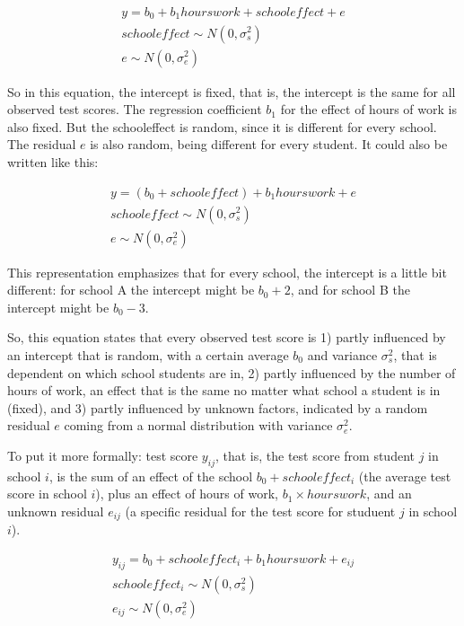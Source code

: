 \documentclass[]{book}\usepackage[]{graphicx}\usepackage[]{color}
\begin{document}
\begin{eqnarray}
y = b_0 + b_1 hourswork + schooleffect + e \\
schooleffect \sim N(0, \sigma_s^2)\\
e \sim N(0, \sigma_e^2)
\end{eqnarray}

So in this equation, the intercept is fixed, that is, the intercept is the same for all observed test scores. The regression coefficient $b_1$ for the effect of hours of work is also fixed. But the schooleffect is random, since it is different for every school. The residual $e$ is also random, being different for every student. It could also be written like this:

\begin{eqnarray}
y = (b_0  + schooleffect) + b_1 hourswork + e \\
schooleffect \sim N(0, \sigma_s^2)\\
e \sim N(0, \sigma_e^2)
\end{eqnarray}


This representation emphasizes that for every school, the intercept is a little bit different: for school A the intercept might be $b_0 + 2$, and for school B the intercept might be $b_0 - 3$.

So, this equation states that every observed test score is 1) partly influenced by an intercept that is random, with a certain average $b_0$ and variance $\sigma_s^2$, that is dependent on which school students are in, 2) partly influenced by the number of hours of work, an effect that is the same no matter what school a student is in (fixed), and 3) partly influenced by unknown factors, indicated by a random residual $e$ coming from a normal distribution with variance $\sigma^2_e$.

To put it more formally: test score $y_{ij}$, that is, the test score from student $j$ in school $i$, is the sum of an effect of the school $b_0 + schooleffect_i$ (the average test score in school $i$), plus an effect of hours of work,  $b_1 \times hourswork$, and an unknown residual $e_{ij}$ (a specific residual for the test score for studuent $j$ in school $i$).

\begin{eqnarray}
y_{ij} = b_0 + schooleffect_i + b_1 hourswork + e_{ij} \\
schooleffect_i \sim N(0, \sigma_s^2)\\
e_{ij} \sim N(0, \sigma_e^2)
\end{eqnarray}
\end{document}
